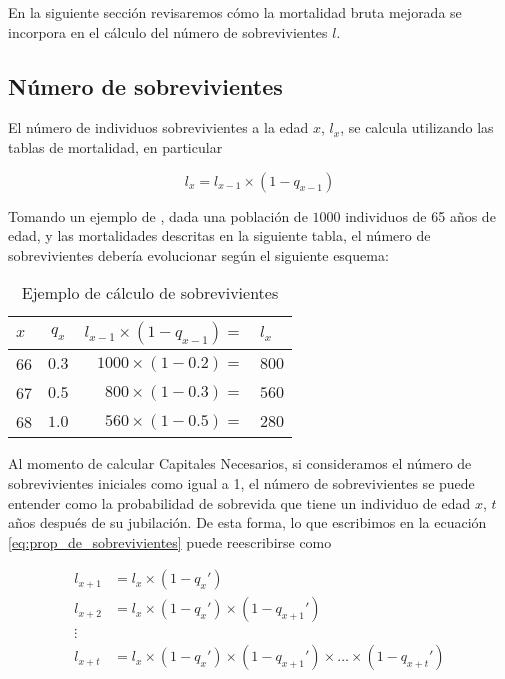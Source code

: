 \documentclass[letterpaper, 11pt]{article}
\begin{document}
En la siguiente secci\'on revisaremos c\'omo la mortalidad bruta mejorada se
incorpora en el c\'alculo del n\'umero de sobrevivientes $l$.

\subsection{N\'umero de sobrevivientes}

El n\'umero de individuos sobrevivientes a la edad $x$, $l_x$, se calcula
utilizando las tablas de mortalidad, en particular

\begin{equation}\label{eq:prop_de_sobrevivientes}
l_x = l_{x - 1} \times (1 - q_{x-1})
\end{equation}

Tomando un ejemplo de , dada una poblaci\'on de $1000$
individuos de 65 a\~nos de edad, y las mortalidades descritas en la siguiente
tabla, el n\'umero de sobrevivientes deber\'ia evolucionar seg\'un el siguiente
esquema:

\begin{table}[H]
\centering
\caption{Ejemplo de c\'alculo de sobrevivientes}
\begin{tabular}{lcrl}
\toprule
$x$ & $q_x$& $l_{x-1}\times(1-q_{x-1})=$ & $l_x$ \\ \midrule
66 & $0.3$ & $1000 \times (1 - 0.2)=$ & $800$ \\
67 & $0.5$ & $800 \times (1 - 0.3)=$   & $560$ \\
68 & $1.0$ & $560 \times (1 - 0.5)=$   & $280$ \\ \bottomrule
\end{tabular}
\end{table}

Al momento de calcular Capitales Necesarios, si consideramos el n\'umero
de sobrevivientes iniciales como igual a 1, el n\'umero de
sobrevivientes se puede entender como la probabilidad de sobrevida que tiene un
individuo de edad $x$, $t$ a\~nos despu\'es de su jubilaci\'on. De esta forma,
lo que escribimos en la ecuaci\'on \ref{eq:prop_de_sobrevivientes} puede reescribirse
como

\begin{equation*}
\begin{array}{rl}
l_{x+1} & = l_{x}\times(1 - q_{x}') \\
l_{x+2} & = l_{x}\times(1 - q_{x}')\times(1 - q_{x+1}') \\
\vdots \\
l_{x+t} & = l_{x}\times(1 - q_{x}')\times(1 - q_{x+1}') \times \dots \times (1 - q_{x + t}')
\end{array}
\end{equation*}
\end{document}
